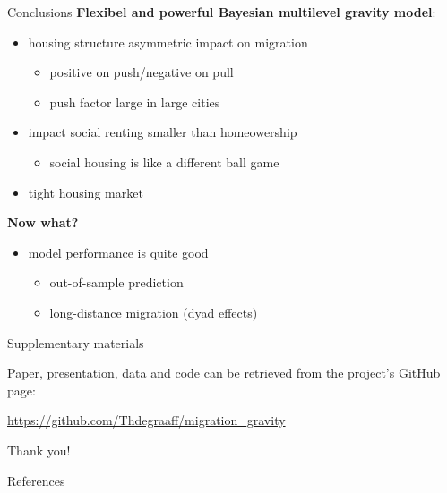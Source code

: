 \documentclass{beamer}
\begin{document}
\begin{frame}{Conclusions}
\textbf{Flexibel and powerful Bayesian multilevel gravity model}:
\begin{itemize}
  \item housing structure asymmetric impact on migration
  \begin{itemize}
	\item positive on push/negative on pull
	\item push factor large in large cities
  \end{itemize}
	\item impact social renting smaller than homeowership
\citep{boyle1998migration}
	\begin{itemize}
	  \item social housing is like a \alert{different ball game}
	\end{itemize}
	\item tight housing market
\end{itemize}

\textbf{Now what?}
\begin{itemize}
	\item model \alert{performance} is quite good
	\begin{itemize}
	  \item out-of-sample prediction
	  \item \alert{long-distance} migration (dyad effects)
	\end{itemize}
\end{itemize}
\end{frame}

\begin{frame}{Supplementary materials}

Paper, presentation, data and code can be retrieved from the project's GitHub page: 

\begin{center}\url{https://github.com/Thdegraaff/migration\_gravity}\end{center}

\end{frame}

\begin{frame}[standout]
Thank you!
\end{frame}

\appendix

\begin{frame}[allowframebreaks]{References}

		\printbibliography[heading=none]

\end{frame}
\end{document}
